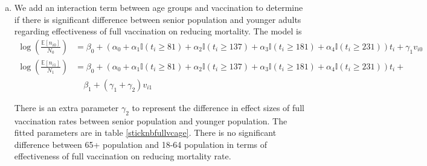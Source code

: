 \documentclass[12pt]{article}
\begin{document}
\begin{enumerate}[(a)]
	\item We add an interaction term between age groups and vaccination to determine if there is significant difference between senior population and younger adults regarding effectiveness of full vaccination on reducing mortality. The model is
		\begin{align*}
		\log(\frac{\mathbb{E}[n_{i0}]}{N_{0}}) &= \beta_{0} + \left(\alpha_{0} + \alpha_{1}\mathbb{I}(t_{i} \geq 81) + \alpha_{2}\mathbb{I}(t_{i} \geq 137) +\alpha_{3} \mathbb{I}(t_{i} \geq 181) + \alpha_{4}\mathbb{I}(t_{i} \geq 231)\right) t_{i} + \gamma_{1} v_{i0}\\
		\log(\frac{\mathbb{E}[n_{i1}]}{N_{1}}) &= \beta_{0} + \left(\alpha_{0} + \alpha_{1}\mathbb{I}(t_{i} \geq 81) + \alpha_{2}\mathbb{I}(t_{i} \geq 137) +\alpha_{3} \mathbb{I}(t_{i} \geq 181) + \alpha_{4}\mathbb{I}(t_{i} \geq 231)\right) t_{i} +  \\
		&\quad \beta_{1} +(\gamma_{1}+\gamma_{2}) v_{i1}
	\end{align*}
	
	There is an extra parameter $\gamma_{2}$ to represent the difference in effect sizes of full vaccination rates between senior population and younger population. The fitted parameters are in table \ref{sticknbfullvcage}. There is no significant difference between 65+ population and 18-64 population in terms of effectiveness of full vaccination on reducing mortality rate.
	

\end{enumerate}
\end{document}
